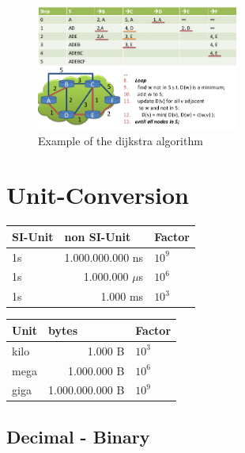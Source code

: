 \documentclass{article}
\begin{document}
\begin{figure}[h]
    \centering
    \includegraphics[width=0.6\textwidth]{media/dijkstra.png}
    \caption{Example of the dijkstra algorithm}
    \label{fig:dijkstra}
\end{figure}

\section{Unit-Conversion}
\begin{minipage}{0.49\linewidth}
	\begin{tabular}{|l|r|l|}
		\hline
		\textbf{SI-Unit} & \multicolumn{1}{l|}{\textbf{non SI-Unit}} & \textbf{Factor} \\ \hline
		1s               & 1.000.000.000 ns                          & $ 10^{9} $      \\ \hline
		1s               & 1.000.000 $ \mu $s                                  & $ 10^{6} $      \\ \hline
		1s               & 1.000 ms                                  & $ 10^{3} $      \\ \hline
	\end{tabular}
\end{minipage}
\begin{minipage}{0.49\linewidth}
	\begin{tabular}{|l|r|l|}
		\hline
		\textbf{Unit} & \multicolumn{1}{l|}{\textbf{bytes}} & \textbf{Factor} \\ \hline
		kilo               & 1.000 B                         & $ 10^{3} $      \\ \hline
		mega               & 1.000.000 B                     & $ 10^{6} $      \\ \hline
		giga               & 1.000.000.000 B                 & $ 10^{9} $      \\ \hline
	\end{tabular}
\end{minipage}

\subsection{Decimal - Binary}
\end{document}
